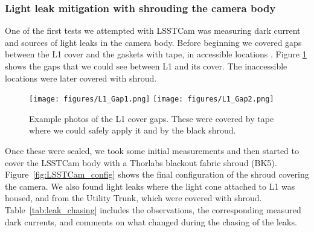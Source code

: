 \subsubsection{Light leak mitigation with shrouding the camera
body}\label{light-leak-mitigation-with-shrouding-the-camera-body}

One of the first tests we attempted with LSSTCam was measuring dark
current and sources of light leaks in the camera body. Before beginning we covered gaps between the L1 cover and the gaskets with tape, in accessible locations . Figure \ref{fig:L1_Gaps} shows the gaps that we could see between L1 and its cover. The inaccessible locations were later covered with shroud.

\begin{figure}[htbp]
\centering
\texttt{[image: figures/L1\_Gap1.png]}
\texttt{[image: figures/L1\_Gap2.png]}
\caption{Example photos of the L1 cover gaps. These were covered by tape where we could safely apply it and by the black shroud.}
\label{fig:L1_Gaps}
\end{figure}

Once these were sealed, we took some initial measurements and then
started to cover the LSSTCam body with a Thorlabs blackout fabric shroud (BK5). Figure~\ref{fig:LSSTCam_config} shows the final configuration of the shroud covering the
camera.
We also found light leaks where the light cone attached to L1 was housed, and from the Utility Trunk, which were covered with shroud. Table~\ref{tab:leak_chasing} includes the observations, the corresponding measured dark currents, and comments on what changed during the chasing of the leaks.


